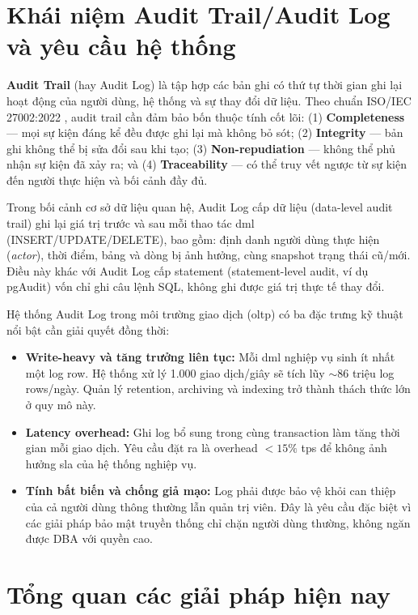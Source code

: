 \section{Khái niệm Audit Trail/Audit Log và yêu cầu hệ thống}

\textbf{Audit Trail} (hay Audit Log) là tập hợp các bản ghi có thứ tự thời gian ghi lại hoạt động của người dùng, hệ thống và sự thay đổi dữ liệu. Theo chuẩn ISO/IEC 27002:2022 \cite{ISO27002}, audit trail cần đảm bảo bốn thuộc tính cốt lõi: (1) \textbf{Completeness} --- mọi sự kiện đáng kể đều được ghi lại mà không bỏ sót; (2) \textbf{Integrity} --- bản ghi không thể bị sửa đổi sau khi tạo; (3) \textbf{Non-repudiation} --- không thể phủ nhận sự kiện đã xảy ra; và (4) \textbf{Traceability} --- có thể truy vết ngược từ sự kiện đến người thực hiện và bối cảnh đầy đủ.

Trong bối cảnh cơ sở dữ liệu quan hệ, Audit Log cấp dữ liệu (data-level audit trail) ghi lại giá trị trước và sau mỗi thao tác \ac{dml} (INSERT/UPDATE/DELETE), bao gồm: định danh người dùng thực hiện (\textit{actor}), thời điểm, bảng và dòng bị ảnh hưởng, cùng snapshot trạng thái cũ/mới. Điều này khác với Audit Log cấp statement (statement-level audit, ví dụ pgAudit) vốn chỉ ghi câu lệnh SQL, không ghi được giá trị thực tế thay đổi.

Hệ thống Audit Log trong môi trường giao dịch (\ac{oltp}) có ba đặc trưng kỹ thuật nổi bật cần giải quyết đồng thời:

\begin{itemize}
    \item \textbf{Write-heavy và tăng trưởng liên tục:} Mỗi \ac{dml} nghiệp vụ sinh ít nhất một log row. Hệ thống xử lý 1.000 giao dịch/giây sẽ tích lũy $\sim$86 triệu log rows/ngày. Quản lý retention, archiving và indexing trở thành thách thức lớn ở quy mô này.
    \item \textbf{Latency overhead:} Ghi log bổ sung trong cùng transaction làm tăng thời gian mỗi giao dịch. Yêu cầu đặt ra là overhead $< 15\%$ \ac{tps} để không ảnh hưởng \ac{sla} của hệ thống nghiệp vụ.
    \item \textbf{Tính bất biến và chống giả mạo:} Log phải được bảo vệ khỏi can thiệp của cả người dùng thông thường lẫn quản trị viên. Đây là yêu cầu đặc biệt vì các giải pháp bảo mật truyền thống chỉ chặn người dùng thường, không ngăn được DBA với quyền cao.
\end{itemize}

\section{Tổng quan các giải pháp hiện nay}

